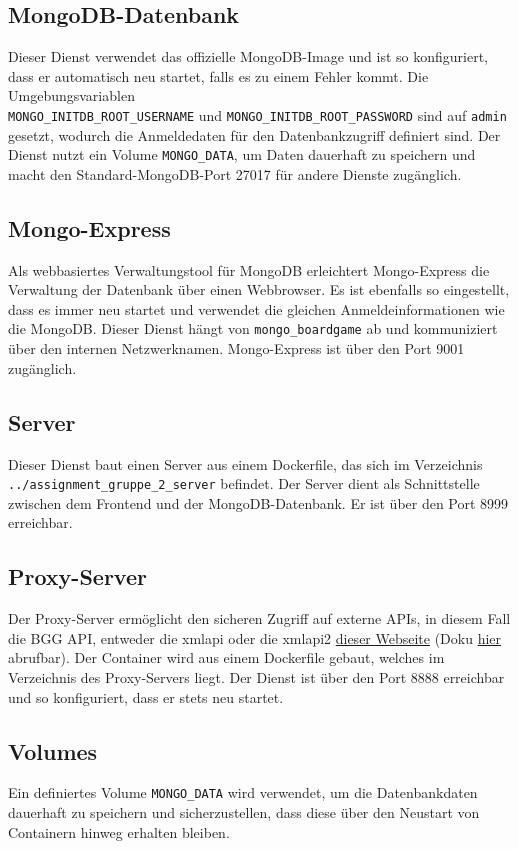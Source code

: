 \subsection{MongoDB-Datenbank}
Dieser Dienst verwendet das offizielle
MongoDB-Image und ist so konfiguriert, dass er automatisch neu startet, falls es zu einem
Fehler kommt.
Die Umgebungsvariablen \\\texttt{MONGO\_INITDB\_ROOT\_USERNAME} und
\texttt{MONGO\_INITDB\_ROOT\_PASSWORD} sind auf \texttt{admin} gesetzt, wodurch die Anmeldedaten für
den Datenbankzugriff definiert sind. Der Dienst nutzt ein Volume \texttt{MONGO\_DATA}, um Daten
dauerhaft zu speichern und macht den Standard-MongoDB-Port 27017 für andere Dienste
zugänglich.
\subsection{Mongo-Express}
Als webbasiertes Verwaltungstool für
MongoDB erleichtert Mongo-Express die Verwaltung der Datenbank über einen Webbrowser.
Es ist ebenfalls so eingestellt, dass es immer neu startet und verwendet die gleichen
Anmeldeinformationen wie die MongoDB. Dieser Dienst hängt von \texttt{mongo\_boardgame} ab
und kommuniziert über den internen Netzwerknamen. Mongo-Express ist über den Port 9001
zugänglich.
\subsection{Server}
Dieser Dienst baut einen Server aus einem Dockerfile, das sich im Verzeichnis
\\\texttt{../assignment\_gruppe\_2\_server} befindet. Der Server dient als Schnittstelle zwischen dem
Frontend und der MongoDB-Datenbank. Er ist über den Port 8999 erreichbar.
\subsection{Proxy-Server}
Der Proxy-Server ermöglicht den sicheren Zugriff auf externe
APIs, in diesem Fall die BGG \ac{API}, entweder die xmlapi oder die xmlapi2
\href{https://api.geekdo.com/xmlapi2}{dieser Webseite} (Doku \href{https://boardgamegeek.com/wiki/page/BGG_XML_API2}{hier} abrufbar).
Der Container wird aus einem Dockerfile gebaut, welches im Verzeichnis des Proxy-Servers liegt. Der
Dienst ist über den Port 8888 erreichbar und so konfiguriert, dass er stets neu startet.
\subsection{Volumes}
Ein definiertes Volume \texttt{MONGO\_DATA} wird verwendet, um die Datenbankdaten
dauerhaft zu speichern und sicherzustellen, dass diese über den Neustart von Containern
hinweg erhalten bleiben.
